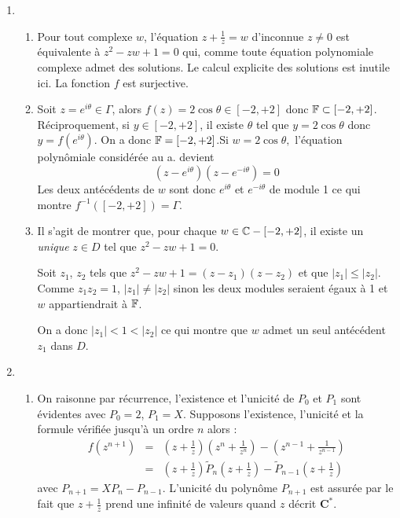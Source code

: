 \begin{enumerate}
\item
\begin{enumerate}
\item  Pour tout complexe $w$, l'{\'e}quation $z+\frac{1}{z}=w$ d'inconnue $%
z\neq 0$ est {\'e}quivalente {\`a} $z^{2}-zw+1=0$ qui, comme toute
{\'e}quation polynomiale complexe admet des solutions. Le calcul explicite des solutions est inutile ici. La fonction $f$ est surjective.

\item  Soit $z=e^{i\theta }\in \Gamma $, alors $f(z)=2\cos \theta \in \left[-2,+2\right] $ donc $\Bbb{F}\subset \left[ -2,+2\right] $. R{\'e}ciproquement, si $%
y\in \left[ -2,+2\right] $, il existe $\theta $ tel que $y=2\cos
\theta $ donc $y=f(e^{i\theta })$. On a donc $\Bbb{F}=\left[
-2,+2\right] $.\newline Si $w=2\cos \theta ,$ l'{\'e}quation
polyn{\^o}miale consid{\'e}r{\'e}e au a. devient
\[(z-e^{i\theta })(z-e^{-i\theta })=0\]
Les deux ant{\'e}c{\'e}dents de $w$ sont donc $e^{i\theta }$ et $e^{-i\theta }$ de
module 1 ce qui montre $f^{-1}(\left[ -2,+2\right] )=\Gamma $.

\item  Il s'agit de montrer que, pour chaque $w\in \Bbb{C}-\left[-2,+2\right] $, il existe un \emph{unique} $z\in D$ tel que $z^{2}-zw+1=0$.

Soit $z_{1}$, $z_{2}$ tels que $z^{2}-zw+1=(z-z_{1})(z-z_{2})$ et
que $\left| z_{1}\right| \leq \left| z_{2}\right| $. Comme
$z_{1}z_{2}=1$, $\left| z_{1}\right| \neq \left| z_{2}\right| $
sinon les deux modules seraient {\'e}gaux {\`a} 1 et $w$ appartiendrait {\`a}
$\Bbb{F}$.

On a donc $\left| z_{1}\right| <1<\left| z_{2}\right| $ ce qui montre que $w$ admet un seul ant{\'e}c{\'e}dent $z_{1}$ dans $D$.
\end{enumerate}

\item
\begin{enumerate}
\item  On raisonne par r{\'e}currence, l'existence et l'unicit{\'e} de $P_{0} $ et $P_{1}$ sont {\'e}videntes avec $P_{0}=2$, $P_{1}=X$. Supposons l'existence, l'unicit{\'e} et la formule v{\'e}rifi{\'e}e jusqu'{\`a} un ordre $n$ alors :
\begin{eqnarray*}
f(z^{n+1})&=&(z+\frac{1}{z})(z^{n}+\frac{1}{z^{n}})-(z^{n-1}+\frac{1}{z^{n-1}})\\
&=&(z+\frac{1}{z})\tilde{P}_{n}(z+\frac{1}{z})-\tilde{P}_{n-1}(z+\frac{1}{z})
\end{eqnarray*}
avec $P_{n+1}=XP_{n}-P_{n-1}$. L'unicit{\'e} du polyn{\^o}me $P_{n+1}$ est
assur{\'e}e par le fait que $z+\frac{1}{z}$ prend une infinit{\'e} de
valeurs quand $z$ d{\'e}crit $\mathbf{C}^{*}$.


\end{enumerate}
\end{enumerate}
